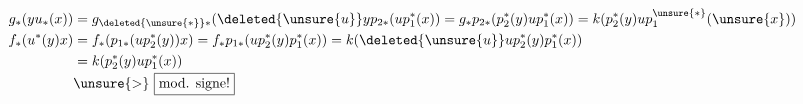 
\[
\begin{aligned}
 g_*(yu_*(x))&=g_{\deleted{\unsure{*}}*}(\deleted{\unsure{u}}y p_{2*}(u p_1^*(x))=g_*p_{2*}(p_2^*(y)u p_1^*(x))=k(p_2^*(y)u p_1^{\unsure{*}}(\unsure{x}))\\
 f_*(u^*(y)x)&=f_*(p_{1*}(u p_2^*(y))x)=f_*p_{1*}(u p_2^*(y)p_1^*(x))=k(\deleted{\unsure{u}}u p_2^*(y)p_1^*(x))\\
 &=k(p_2^*(y)u p_1^*(x))\\[-2pt]
 &\unsure{>}\ \boxed{\text{mod. signe!}}
\end{aligned}
\]
